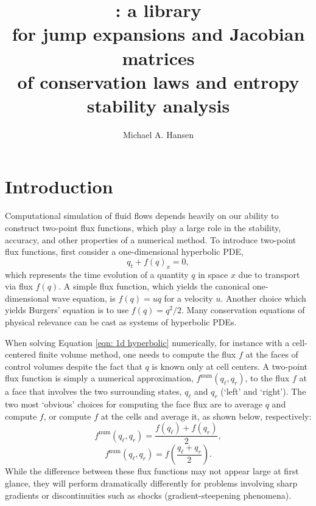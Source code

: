 \documentclass[10pt]{article}
\title{\Relleno{}: a \sage{} library \\ for jump expansions and Jacobian matrices \\ of conservation laws and entropy stability analysis}
\author{Michael A. Hansen}
\newcommand{\num}{\mathrm{num}}
\begin{document}
\maketitle

\section{Introduction}
Computational simulation of fluid flows depends heavily on our ability to construct two-point flux functions, which play a large role in the stability, accuracy, and other properties of a numerical method.
To introduce two-point flux functions, first consider a one-dimensional hyperbolic PDE,
\begin{equation}
	q_t + f(q)_x = 0,
	\label{eqn: 1d hyperbolic}
\end{equation}
which represents the time evolution of a quantity $q$ in space $x$ due to transport via flux $f(q)$.
A simple flux function, which yields the canonical one-dimensional wave equation, is $f(q)=uq$ for a velocity $u$.
Another choice which yields Burgers' equation is to use $f(q)=q^2/2$.
Many conservation equations of physical relevance can be cast as systems of hyperbolic PDEs.

When solving Equation \eqref{eqn: 1d hyperbolic} numerically, for instance with a cell-centered finite volume method, one needs to compute the flux $f$ at the faces of control volumes despite the fact that $q$ is known only at cell centers.
A two-point flux function is simply a numerical approximation, $f^\num(q_\ell,q_r)$, to the flux $f$ at a face that involves the two surrounding states, $q_\ell$ and $q_r$ (`left' and `right').
The two most `obvious' choices for computing the face flux are to average $q$ and compute $f$, or compute $f$ at the cells and average it, as shown below, respectively:
\begin{equation}
	f^\num(q_\ell,q_r) = \frac{f(q_\ell)+f(q_r)}{2},
\end{equation}
\begin{equation}
	f^\num(q_\ell,q_r) = f\left(\frac{q_\ell+q_r}{2}\right).
\end{equation}
While the difference between these flux functions may not appear large at first glance, they will perform dramatically differently for problems involving sharp gradients or discontinuities such as shocks (gradient-steepening phenomena).
\end{document}
